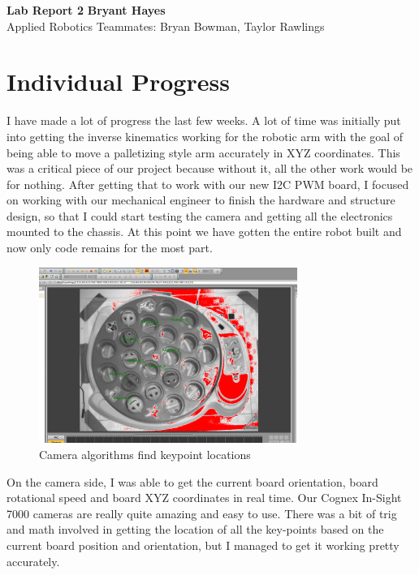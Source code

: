 \documentclass[a4paper, 11pt]{article}
\begin{document}
\noindent
\large\textbf{Lab Report 2} \hfill \textbf{Bryant Hayes} \\
\normalsize Applied Robotics \hfill Teammates: Bryan Bowman, Taylor Rawlings \\

\section*{Individual Progress}
I have made a lot of progress the last few weeks. A lot of time was initially put into getting the inverse kinematics working for the robotic arm with the goal of being able to move a palletizing style arm accurately in XYZ coordinates. This was a critical piece of our project because without it, all the other work would be for nothing. After getting that to work with our new I2C PWM board, I focused on working with our mechanical engineer to finish the hardware and structure design, so that I could start testing the camera and getting all the electronics mounted to the chassis. At this point we have gotten the entire robot built and now only code remains for the most part.\\

\begin{figure}[h]
	\caption{Camera algorithms find keypoint locations}
	\centering
	\includegraphics[width=0.75\textwidth]{Capture}
\end{figure}

\noindent On the camera side, I was able to get the current board orientation, board rotational speed and board XYZ coordinates in real time. Our Cognex In-Sight 7000 cameras are really quite amazing and easy to use. There was a bit of trig and math involved in getting the location of all the key-points based on the current board position and orientation, but I managed to get it working pretty accurately.
\end{document}
